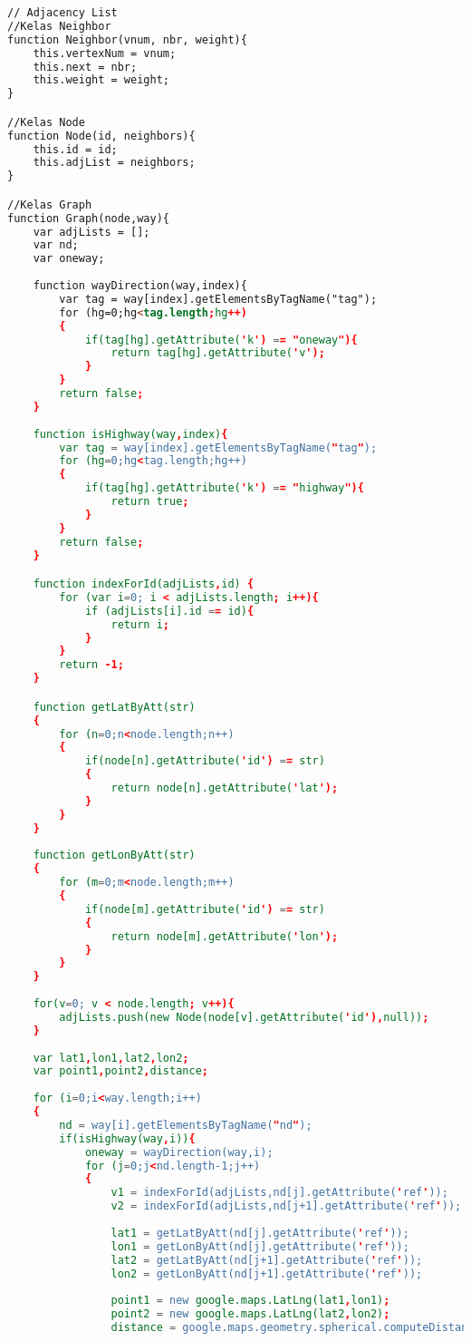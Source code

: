\begin{lstlisting}[language=HTML,basicstyle=\tiny,caption=aplikasi.html]
// Adjacency List
//Kelas Neighbor
function Neighbor(vnum, nbr, weight){
    this.vertexNum = vnum;
    this.next = nbr;
	this.weight = weight;
}

//Kelas Node
function Node(id, neighbors){
    this.id = id;
    this.adjList = neighbors;
}

//Kelas Graph
function Graph(node,way){
	var adjLists = [];
	var nd;
	var oneway;
	
	function wayDirection(way,index){
		var tag = way[index].getElementsByTagName("tag");
		for (hg=0;hg<tag.length;hg++)
		{
			if(tag[hg].getAttribute('k') == "oneway"){
				return tag[hg].getAttribute('v');
			}
		}
		return false;
	}
	 
	function isHighway(way,index){
		var tag = way[index].getElementsByTagName("tag");
		for (hg=0;hg<tag.length;hg++)
		{
			if(tag[hg].getAttribute('k') == "highway"){
				return true;
			}
		}
		return false;
	}

	function indexForId(adjLists,id) {
		for (var i=0; i < adjLists.length; i++){
			if (adjLists[i].id == id){
				return i;
			}
		}
		return -1;
	}

	function getLatByAtt(str)
	{
		for (n=0;n<node.length;n++)
		{
			if(node[n].getAttribute('id') == str)
			{
				return node[n].getAttribute('lat');
			}
		}
	}
	
	function getLonByAtt(str)
	{
		for (m=0;m<node.length;m++)
		{
			if(node[m].getAttribute('id') == str)
			{
				return node[m].getAttribute('lon');
			}
		}
	}
	
	for(v=0; v < node.length; v++){
		adjLists.push(new Node(node[v].getAttribute('id'),null));
	}
	
	var lat1,lon1,lat2,lon2;
	var point1,point2,distance;
	
	for (i=0;i<way.length;i++)
	{
		nd = way[i].getElementsByTagName("nd");
		if(isHighway(way,i)){
			oneway = wayDirection(way,i);
			for (j=0;j<nd.length-1;j++)
			{
				v1 = indexForId(adjLists,nd[j].getAttribute('ref'));
				v2 = indexForId(adjLists,nd[j+1].getAttribute('ref'));
				
				lat1 = getLatByAtt(nd[j].getAttribute('ref'));
				lon1 = getLonByAtt(nd[j].getAttribute('ref'));
				lat2 = getLatByAtt(nd[j+1].getAttribute('ref'));
				lon2 = getLonByAtt(nd[j+1].getAttribute('ref'));
	
				point1 = new google.maps.LatLng(lat1,lon1);
				point2 = new google.maps.LatLng(lat2,lon2);
				distance = google.maps.geometry.spherical.computeDistanceBetween(point1, point2);
				

\end{lstlisting}
